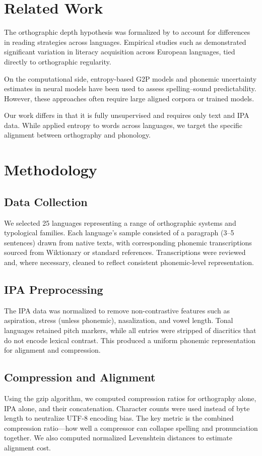 \documentclass[12pt]{article}
\begin{document}
\section{Related Work}
The orthographic depth hypothesis was formalized by \citet{frost1994} to account for differences in reading strategies across languages. Empirical studies such as \citet{seymour2003} demonstrated significant variation in literacy acquisition across European languages, tied directly to orthographic regularity.

On the computational side, entropy-based G2P models \citep{jiampojamarn2008} and phonemic uncertainty estimates in neural models \citep{mansbridge2022} have been used to assess spelling–sound predictability. However, these approaches often require large aligned corpora or trained models.

Our work differs in that it is fully unsupervised and requires only text and IPA data. While \citet{bentz2017} applied entropy to words across languages, we target the specific alignment between orthography and phonology.

\section{Methodology}
\subsection{Data Collection}
We selected 25 languages representing a range of orthographic systems and typological families. Each language's sample consisted of a paragraph (3–5 sentences) drawn from native texts, with corresponding phonemic transcriptions sourced from Wiktionary or standard references. Transcriptions were reviewed and, where necessary, cleaned to reflect consistent phonemic-level representation.

\subsection{IPA Preprocessing}
The IPA data was normalized to remove non-contrastive features such as aspiration, stress (unless phonemic), nasalization, and vowel length. Tonal languages retained pitch markers, while all entries were stripped of diacritics that do not encode lexical contrast. This produced a uniform phonemic representation for alignment and compression.

\subsection{Compression and Alignment}
Using the gzip algorithm, we computed compression ratios for orthography alone, IPA alone, and their concatenation. Character counts were used instead of byte length to neutralize UTF-8 encoding bias. The key metric is the combined compression ratio—how well a compressor can collapse spelling and pronunciation together. We also computed normalized Levenshtein distances to estimate alignment cost.
\end{document}
